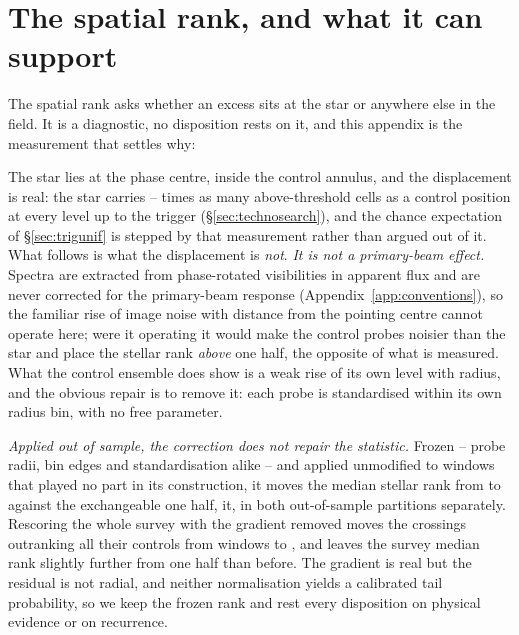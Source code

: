 \section{The spatial rank, and what it can support}
\label{app:radius}

The spatial rank asks whether an excess sits at the star or anywhere else in
the field. It is a diagnostic, no disposition rests on it, and this appendix
is the measurement that settles why: \rankstatus{}

The star lies at the phase centre, inside the control annulus, and the
displacement is real: the star carries \CkRatioLo--\CkRatioHi{} times as many
above-threshold cells as a control position at every level up to the trigger
(\S\ref{sec:technosearch}), and the chance expectation of
\S\ref{sec:trigunif} is stepped by that measurement rather than argued out of
it. What follows is what the displacement is \emph{not}.
\emph{It is not a primary-beam effect.} Spectra are
extracted from phase-rotated visibilities in apparent flux and are never
corrected for the primary-beam response (Appendix~\ref{app:conventions}), so
the familiar rise of image noise with distance from the pointing centre
cannot operate here; were it operating it would make the control probes
noisier than the star and place the stellar rank \emph{above} one half, the
opposite of what is measured. What the control ensemble does show is a weak
rise of its own level with radius, and the obvious repair is to remove it:
each probe is standardised within its own radius bin, with no free parameter.

\emph{Applied out of sample, the correction does not repair the statistic.}
Frozen -- probe radii, bin edges and standardisation alike -- and applied
unmodified to \RadValStarN{} windows that played no part in its construction,
it moves the median stellar rank from \RadValStarRawMed{} to
\RadValStarCorMed{} against the exchangeable one half, \RadValStarToward{}
it, in both out-of-sample partitions separately. Rescoring the whole survey
with the gradient removed moves the crossings outranking all their controls
from \LocStageGlobal{} windows to \LocStageLocal, and leaves the survey
median rank slightly further from one half than before. The gradient is real
but the residual is not radial, and neither normalisation yields a calibrated
tail probability, so we keep the frozen rank and rest every disposition on
physical evidence or on recurrence.

